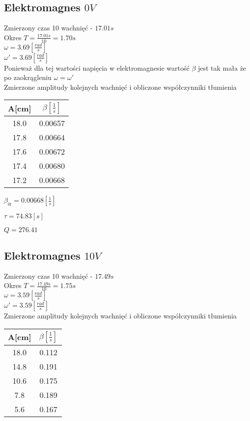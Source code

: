 \documentclass[]{article}
\begin{document}
	\subsection{Elektromagnes $0V$}
	Zmierzony czas 10 wachnięć - $17.01s$\\
	Okres $T = \frac{17.01s}{10}=1.70s$\\
	$\omega = 3.69 \left[ \frac{rad}{s}\right]$\\
	$\omega' = 3.69 \left[ \frac{rad}{s}\right]$\\
	Ponieważ dla tej wartości napięcia w elektromagnesie wartość $\beta$ jest tak mała że po zaokrągleniu $\omega=\omega'$\\
	Zmierzone amplitudy kolejnych wachnięć i obliczone współczynniki tłumienia
	\begin{table}[h]
		\begin{tabular}{|c|c|}
			\hline 
			A[cm] & $\beta\left[ \frac{1}{s}\right] $ \\ 
			\hline 
			18.0 & 0.00657 \\ 
			\hline 
			17.8 & 0.00664 \\ 
			\hline 
			17.6 & 0.00672 \\ 
			\hline 
			17.4 & 0.00680 \\ 
			\hline 
			17.2 & 0.00668 \\ 
			\hline 
		\end{tabular} 
	\end{table}

	$\beta_{\text{śr}} = 0.00668 \left[ \frac{1}{s}\right] $
	
	$\tau=74.83[s]$
	
	$Q = 276.41$
	
	\subsection{Elektromagnes $10V$}
	Zmierzony czas 10 wachnięć - $17.49s$\\
	Okres $T=\frac{17.49s}{10} = 1.75s$\\
	$\omega = 3.59 \left[ \frac{rad}{s}\right]$\\
	$\omega' = 3.59 \left[ \frac{rad}{s}\right]$\\
	Zmierzone amplitudy kolejnych wachnięć i obliczone współczynniki tłumienia
	\begin{table}[h]
		\begin{tabular}{|c|c|}
			\hline 
			A[cm] & $\beta\left[ \frac{1}{s}\right] $ \\ 
			\hline 
			18.0 & 0.112 \\ 
			\hline 
			14.8 & 0.191 \\ 
			\hline 
			10.6 & 0.175 \\ 
			\hline 
			7.8 & 0.189 \\ 
			\hline 
			5.6 & 0.167 \\ 
			\hline 
		\end{tabular} 
	\end{table}
\end{document}
